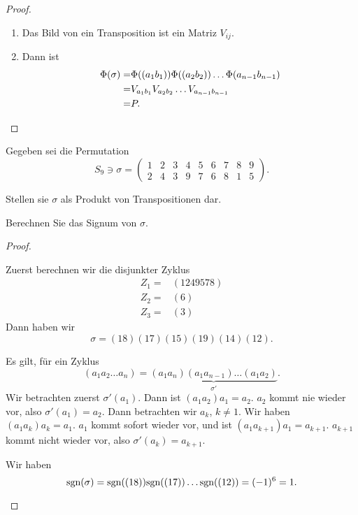 \begin{proof}
\begin{parts}
\begin{enumerate}[label=(\roman*)]
			\item Das Bild von ein Transposition ist ein Matriz $V_{ij}$. 
			\item Dann ist
				\begin{align*}
					\Phi(\sigma)=&\Phi((a_1b_1))\Phi((a_2b_2))\dots\Phi(a_{n-1}b_{n-1})\\
					=& V_{a_1b_1}V_{a_2b_2}\dots V_{a_{n-1}b_{n-1}}\\
					=&P.\qedhere
				\end{align*}
		\end{enumerate}
	\end{parts}
\end{proof}
\begin{Problem}
	Gegeben sei die Permutation
	\[
		S_9\ni \sigma =\begin{pmatrix} 1 & 2 & 3 & 4 & 5 & 6 & 7 & 8 & 9\\2 & 4 & 3 & 9 & 7 & 6 & 8 & 1 & 5 \end{pmatrix} 
	.\] 
	\begin{parts}
	\item Stellen sie $\sigma$ als Produkt von Transpositionen dar.
	\item Berechnen Sie das Signum von $\sigma$.
	\end{parts}
\end{Problem}
\begin{proof}
	\begin{parts}
	\item Zuerst berechnen wir die disjunkter Zyklus
		\begin{align*}
			Z_1=&(1249578)\\
			Z_2=&(6)\\
			Z_3=&(3)
		\end{align*}
		Dann haben wir
		\[
		\sigma=(18)(17)(15)(19)(14)(12)
		.\] 
		\begin{tcolorbox}[title=Begründung]
			Es gilt, f\"{u}r ein Zyklus
			\[
				(a_1a_2\dots a_n)=\underbrace{(a_1a_n)(a_1a_{n-1})\dots (a_1a_2)}_{\sigma'}
			.\] 
			Wir betrachten zuerst $\sigma'(a_1)$. Dann ist $(a_1a_2)a_1=a_2$. $a_2$ kommt nie wieder vor, also $\sigma'(a_1)=a_2$. Dann betrachten wir $a_k$, $k\neq 1$. Wir haben $(a_1a_k)a_k=a_1$. $a_1$ kommt sofort wieder vor, und ist $(a_1a_{k+1})a_1=a_{k+1}$. $a_{k+1}$ kommt nicht wieder vor, also $\sigma'(a_k)=a_{k+1}$.
		\end{tcolorbox}
	\item Wir haben
		\[
			\text{sgn}(\sigma)=\text{sgn}((18))\text{sgn}((17))\dots\text{sgn}((12))=(-1)^6=1
		.\qedhere\] 
	\end{parts}
\end{proof}
